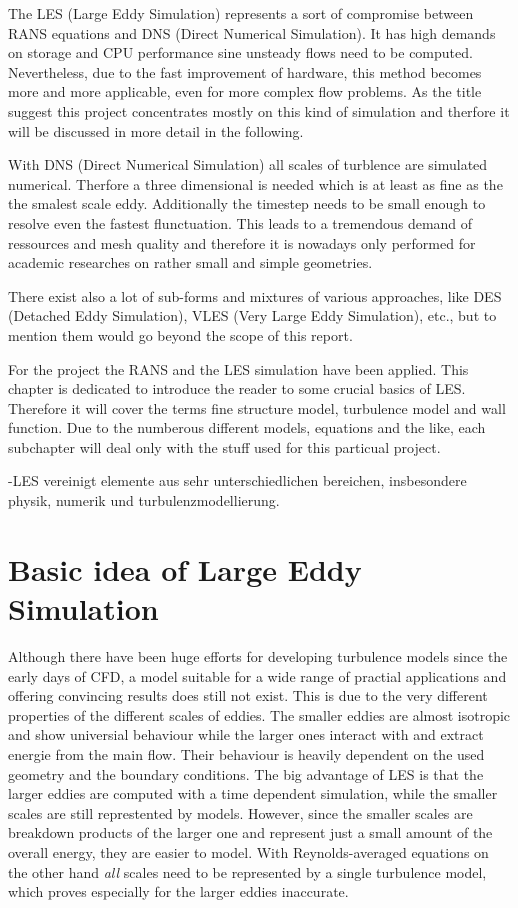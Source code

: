 The LES (Large Eddy Simulation) represents a sort of compromise between RANS equations and DNS (Direct Numerical Simulation). It has high demands on storage and CPU performance sine unsteady flows need to be computed. Nevertheless, due to the fast improvement of hardware, this method becomes more and more applicable, even for more complex flow problems. As the title suggest this project concentrates mostly on this kind of simulation and therfore it will be discussed in more detail in the following.

With DNS (Direct Numerical Simulation) all scales of turblence are simulated numerical. Therfore a three dimensional is needed which is at least as fine as the the smalest scale eddy. Additionally the timestep needs to be small enough to resolve even the fastest flunctuation. This leads to a tremendous demand of ressources and mesh quality and therefore it is nowadays only performed for academic researches on rather small and simple geometries.

There exist also a lot of sub-forms and mixtures of various approaches, like DES (Detached Eddy Simulation), VLES (Very Large Eddy Simulation), etc., but to mention them would go beyond the scope of this report.

For the project the RANS and the LES simulation have been applied. This chapter is dedicated to introduce the reader to some crucial basics of LES. Therefore it will cover the terms fine structure model, turbulence model and wall function. Due to the numberous different models, equations and the like, each subchapter will deal only with the stuff used for this particual project.

-LES vereinigt elemente aus sehr unterschiedlichen bereichen, insbesondere physik, numerik und turbulenzmodellierung.
\section{Basic idea of Large Eddy Simulation}
Although there have been huge efforts for developing turbulence models since the early days of CFD, a model suitable for a wide range of practial applications and offering convincing results does still not exist. This is due to the very different properties of the different scales of eddies. The smaller eddies are almost isotropic and show universial behaviour while the larger ones interact with and extract energie from the main flow. Their behaviour is heavily dependent on the used geometry and the boundary conditions.
The big advantage of LES is that the larger eddies are computed with a time dependent simulation, while the smaller scales are still represtented by models. However, since the smaller scales are breakdown products of the larger one and represent just a small amount of the overall energy, they are easier to model. With Reynolds-averaged equations on the other hand \emph{all} scales need to be represented by a single turbulence model, which proves especially for the larger eddies inaccurate.

